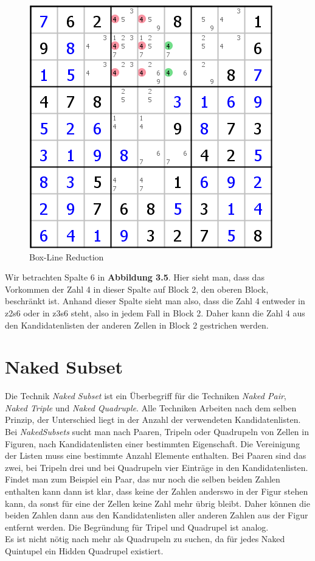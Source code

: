 \documentclass[accentcolor=tud6b,11pt,paper=a4]{tudreport}
\begin{document}
\begin{figure}[h]
\begin{center}
\includegraphics{./img/box_line_reduction.png}
\caption{Box-Line Reduction}
\end{center}
\end{figure}

Wir betrachten Spalte 6 in \textbf{Abbildung 3.5}. Hier sieht man, dass das Vorkommen der Zahl 4 in dieser Spalte auf Block 2, den oberen Block, beschränkt ist. Anhand dieser Spalte sieht man also, dass die Zahl 4 entweder in z2s6 oder in z3s6 steht, also in jedem Fall in Block 2. Daher kann die Zahl 4 aus den Kandidatenlisten der anderen Zellen in Block 2 gestrichen werden.

\newpage
\section{Naked Subset}
Die Technik \textit{Naked Subset} ist ein Überbegriff für die Techniken \textit{Naked Pair}, \textit{Naked Triple} und \textit{Naked Quadruple}. Alle Techniken Arbeiten nach dem selben Prinzip, der Unterschied liegt in der Anzahl der verwendeten Kandidatenlisten. Bei \textit{NakedSubsets} sucht man nach Paaren, Tripeln oder Quadrupeln von Zellen in Figuren, nach Kandidatenlisten einer bestimmten Eigenschaft. Die Vereinigung der Listen muss eine bestimmte Anzahl Elemente enthalten. Bei Paaren sind das zwei, bei Tripeln drei und bei Quadrupeln vier Einträge in den Kandidatenlisten.\\
Findet man zum Beispiel ein Paar, das nur noch die selben beiden Zahlen enthalten kann dann ist klar, dass keine der Zahlen anderswo in der Figur stehen kann, da sonst für eine der Zellen keine Zahl mehr übrig bleibt. Daher können die beiden Zahlen dann aus den Kandidatenlisten aller anderen Zahlen aus der Figur entfernt werden.
Die Begründung für Tripel und Quadrupel ist analog.\\
Es ist nicht nötig nach mehr als Quadrupeln zu suchen, da für jedes Naked Quintupel ein Hidden Quadrupel existiert.
\end{document}
